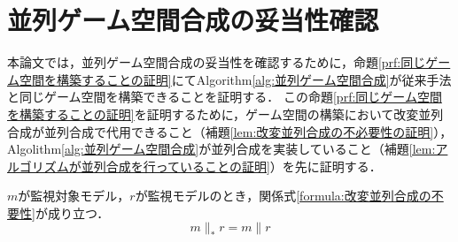 \section{並列ゲーム空間合成の妥当性確認}
\label{section:proof}
本論文では，並列ゲーム空間合成の妥当性を確認するために，命題\ref{prf:同じゲーム空間を構築することの証明}にてAlgorithm\ref{alg:並列ゲーム空間合成}が従来手法と同じゲーム空間を構築できることを証明する．
この命題\ref{prf:同じゲーム空間を構築することの証明}を証明するために，ゲーム空間の構築において改変並列合成が並列合成で代用できること（補題\ref{lem:改変並列合成の不必要性の証明}），Algolithm\ref{alg:並列ゲーム空間合成}が並列合成を実装していること（補題\ref{lem:アルゴリズムが並列合成を行っていることの証明}）を先に証明する．

\begin{lem}
    \label{lem:改変並列合成の不必要性の証明}
    $m$が監視対象モデル，$r$が監視モデルのとき，関係式\ref{formula:改変並列合成の不要性}が成り立つ．
    \renewcommand{\baselinestretch}{0.0}
    \allowdisplaybreaks[4]
    \begin{equation}
    \label{formula:改変並列合成の不要性}
    m \parallel_* r = m \parallel r
    \end{equation}
    \allowdisplaybreaks[0]
    \renewcommand{\baselinestretch}{1}
\end{lem}
